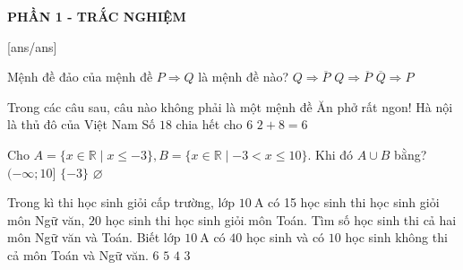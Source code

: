 
\begin{center}
	\textbf{PHẦN 1 - TRẮC NGHIỆM}
\end{center}
[ans/ans]

\begin{ex}%
	Mệnh đề đảo của mệnh đề $P\Rightarrow Q$ là mệnh đề nào?
	{$Q\Rightarrow\overline{P}$}
	{$Q\Rightarrow\overline{P}$}
	{$\overline{Q} \Rightarrow P$}
\end{ex}

\begin{ex}%
	Trong các câu sau, câu nào không phải là một mệnh đề
	\choice
	{\True Ăn phở rất ngon!}
	{Hà nội là thủ đô của Việt Nam}
	{Số $18$ chia hết cho $6$}
	{$2+8=6$}
\end{ex}

\begin{ex}%
	Cho $A=\{x\in\mathbb{R}\mid x \leq-3\}, B=\{x \in \mathbb{R} \mid -3 < x \leq 10\}$. Khi đó $A\cup B$ bằng?
	\choice{$[-3; 10]$}
	{\True $(-\infty; 10]$}
	{$\{-3\}$}
	{$\varnothing$}
	\loigiai{
		Ta có $A\cup B =(-\infty; 10]$.
	}
\end{ex}

\begin{ex}%
	Trong kì thi học sinh giỏi cấp trường, lớp $10 \mathrm{~A}$ có 15 học sinh thi học sinh giỏi môn Ngữ văn, $20$ học sinh thi học sinh giỏi môn Toán. Tìm số học sinh thi cả hai môn Ngữ văn và Toán. Biết lớp $10 \mathrm{~A}$ có $40$ học sinh và có $10$ học sinh không thi cả môn Toán và Ngữ văn.
	\choice
	{$6$}
	{\True $5$}
	{$4$}
	{$3$}
\end{ex}

